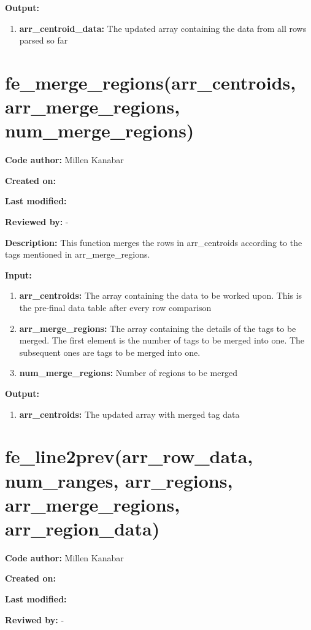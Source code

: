 \documentclass[a4paper, oneside,11pt]{article}
\begin{document}
\textbf{Output:}
\begin{enumerate}
    \item \textbf{arr\_centroid\_data:} The updated array containing the data from all rows parsed so far
\end{enumerate}

\section*{fe\_merge\_regions(arr\_centroids, arr\_merge\_regions, num\_merge\_regions)}
\textbf{Code author:} Millen Kanabar


\textbf{Created on:}


\textbf{Last modified:}


\textbf{Reviewed by:} -

\textbf{Description:}
    This function merges the rows in arr\_centroids according to the tags mentioned in arr\_merge\_regions.
    
\textbf{Input:}
\begin{enumerate}
    \item \textbf{arr\_centroids:} The array containing the data to be worked upon. This is the pre-final data table after every row comparison
    \item \textbf{arr\_merge\_regions:} The array containing the details of the tags to be merged. The first element is the number of tags to be merged into one. The subsequent ones are tags to be merged into one.
    \item \textbf{num\_merge\_regions:} Number of regions to be merged
\end{enumerate}

\textbf{Output:}
\begin{enumerate}
    \item \textbf{arr\_centroids:} The updated array with merged tag data
\end{enumerate}

\newpage

\section*{fe\_line2prev(arr\_row\_data, num\_ranges, arr\_regions, arr\_merge\_regions, \\ arr\_region\_data)}
\textbf{Code author:} Millen Kanabar


\textbf{Created on:}


\textbf{Last modified:}


\textbf{Reviwed by:} -
\end{document}
